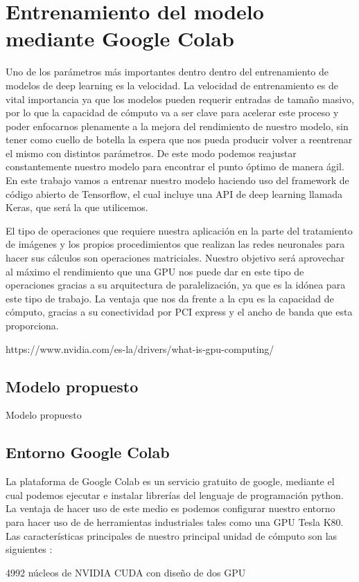 \mbox{}


\chapter{Entrenamiento del modelo mediante Google Colab}
\label{ch:chapter2}
Uno de los parámetros más importantes dentro dentro del entrenamiento de modelos de deep learning es la velocidad.
La velocidad de entrenamiento es de vital importancia ya que los modelos pueden requerir entradas de tamaño masivo, por lo que la capacidad de cómputo
va a ser clave para acelerar este proceso y poder enfocarnos plenamente a la mejora del rendimiento de nuestro modelo, sin tener como cuello de botella la espera
que nos pueda producir volver a reentrenar el mismo con distintos parámetros.
De este modo podemos reajustar constantemente nuestro modelo para encontrar el punto óptimo de manera ágil.
En este trabajo vamos a entrenar nuestro modelo haciendo uso del framework de código abierto de Tensorflow, el cual incluye una API de deep learning llamada Keras, que será la que utilicemos.

El tipo de operaciones que requiere nuestra aplicación en la parte del tratamiento de imágenes y los propios procedimientos que realizan las redes neuronales
para hacer sus cálculos son operaciones matriciales.
Nuestro objetivo será aprovechar al máximo el rendimiento que una GPU nos puede dar en este tipo de operaciones gracias
a su arquitectura de paralelización, ya que es la idónea para este tipo de trabajo.
La ventaja que nos da frente a la cpu es la capacidad de cómputo, gracias a su conectividad por PCI express y el ancho de banda que esta proporciona.

https://www.nvidia.com/es-la/drivers/what-is-gpu-computing/

\section{Modelo propuesto}\label{sec:modelo-propuesto}
Modelo propuesto
\section{Entorno Google Colab}\label{sec:entorno-google-colab}
La plataforma de Google Colab es un servicio gratuito de google, mediante el cual podemos ejecutar e instalar librerías del lenguaje de programación python.
La ventaja de hacer uso de este medio es podemos configurar nuestro entorno para hacer uso de de herramientas industriales tales como una GPU Tesla K80.
Las características principales de nuestro principal unidad de cómputo son las siguientes :

4992 núcleos de NVIDIA CUDA con diseño de dos GPU